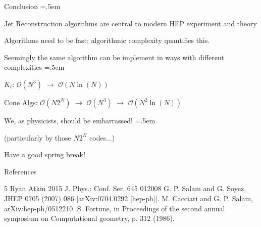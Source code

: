 \documentclass[xcolor={dvipsnames}]{beamer}
\let\olditemize=\itemize
\let\endolditemize=\enditemize
\renewenvironment{itemize}{\olditemize \itemsep=.5em }{\endolditemize}
\newcommand{\ord}[1]{\mathcal{O}(#1)}
\begin{document}
\begin{frame}{Conclusion}
\begin{itemize}
    \item<1-> Jet Reconstruction algorithms are central to modern HEP experiment and theory
    \item<2-> Algorithms need to be fast; algorithmic complexity quantifies this.
    \item<3-> Seemingly the same algorithm can be implement in ways with different complexities
    \begin{itemize}
        \item<4-> $K_t$: $\ord{N^3}$ $\to$ $\ord{N\ln(N)}$
        \item<5-> Cone Algs: $\ord{N2^N}$ $\to$ $\ord{N^3}$ $\to$ $\ord{N^2\ln(N)}$
    \end{itemize}
    \item<6-> We, as physicists, should be embarrassed!
    \begin{itemize}
        \item<7-> (particularly by those $N2^N$ codes...)
    \end{itemize}
    \item<8> Have a good spring break!
\end{itemize}
\end{frame}

\begin{frame}{References}
\begin{thebibliography}{5}
     Ryan Atkin 2015 J. Phys.: Conf. Ser. 645 012008
     G. P. Salam and G. Soyez, JHEP 0705 (2007) 086 [arXiv:0704.0292 [hep-ph]].
     M. Cacciari and G. P. Salam, arXiv:hep-ph/0512210.
     S. Fortune, in Proceedings of the second annual symposium on Computational geometry, p. 312 (1986).
\end{thebibliography}
\end{frame}
\end{document}
